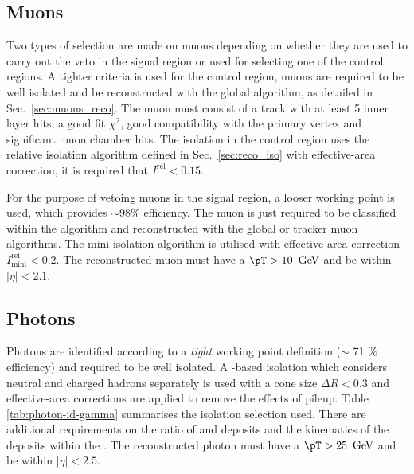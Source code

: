 \subsection{Muons}
\label{sec:muon-id}
Two types of selection are made on muons depending on whether they are
used to carry out the veto in the signal region or used for selecting
one of the control regions. A tighter criteria is used for the control
region, muons are required to be well isolated and be
reconstructed with the global algorithm, as detailed in
Sec.~\ref{sec:muons_reco}. The muon must consist of a track
with at least 5 inner layer hits, a good fit $\chi^2$, good compatibility with
the primary vertex and significant muon chamber hits. The isolation in
the control region uses the relative isolation algorithm
defined in Sec.~\ref{sec:reco_iso} with effective-area
correction, it is required that $I^{\textrm{rel}}<0.15$.  

For the purpose of vetoing muons in the signal region, a looser
working point is used, which provides $\sim98\%$ efficiency. The
muon is just required to be classified within the \PF algorithm and
reconstructed with the global or tracker muon
algorithms. The
mini-isolation algorithm is utilised with effective-area \PU
correction $I^{\textrm{rel}}_{\textrm{mini}} < 0.2$. The reconstructed
muon must have a $\pT>10~\gev$ and be within $|\eta|<2.1$.

\subsection{Photons}
\label{sec:photon-id}

Photons are identified according to a \emph{tight} working point
definition ($\sim$ 71 $\%$ efficiency) and required to be well
isolated.  A \PF-based isolation which considers neutral and charged
hadrons separately is used with a cone size $\Delta R<0.3$
and effective-area corrections are applied to remove the
effects of pileup.  Table \ref{tab:photon-id-gamma}
summarises the isolation selection used. There are additional
requirements on the ratio of \HCAL and \ECAL deposits and the
kinematics of the deposits within the \ECAL. The reconstructed
photon must have a $\pT>25~\gev$ and be within $|\eta|<2.5$.

